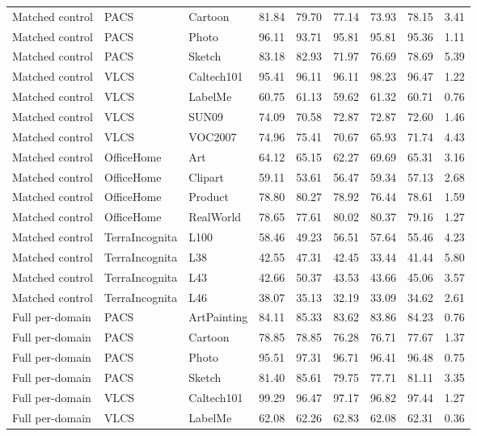 \begin{longtable}{lllrrrrrr}
Matched control & PACS & Cartoon & 81.84 & 79.70 & 77.14 & 73.93 & 78.15 & 3.41 \\
Matched control & PACS & Photo & 96.11 & 93.71 & 95.81 & 95.81 & 95.36 & 1.11 \\
Matched control & PACS & Sketch & 83.18 & 82.93 & 71.97 & 76.69 & 78.69 & 5.39 \\
Matched control & VLCS & Caltech101 & 95.41 & 96.11 & 96.11 & 98.23 & 96.47 & 1.22 \\
Matched control & VLCS & LabelMe & 60.75 & 61.13 & 59.62 & 61.32 & 60.71 & 0.76 \\
Matched control & VLCS & SUN09 & 74.09 & 70.58 & 72.87 & 72.87 & 72.60 & 1.46 \\
Matched control & VLCS & VOC2007 & 74.96 & 75.41 & 70.67 & 65.93 & 71.74 & 4.43 \\
Matched control & OfficeHome & Art & 64.12 & 65.15 & 62.27 & 69.69 & 65.31 & 3.16 \\
Matched control & OfficeHome & Clipart & 59.11 & 53.61 & 56.47 & 59.34 & 57.13 & 2.68 \\
Matched control & OfficeHome & Product & 78.80 & 80.27 & 78.92 & 76.44 & 78.61 & 1.59 \\
Matched control & OfficeHome & RealWorld & 78.65 & 77.61 & 80.02 & 80.37 & 79.16 & 1.27 \\
Matched control & TerraIncognita & L100 & 58.46 & 49.23 & 56.51 & 57.64 & 55.46 & 4.23 \\
Matched control & TerraIncognita & L38 & 42.55 & 47.31 & 42.45 & 33.44 & 41.44 & 5.80 \\
Matched control & TerraIncognita & L43 & 42.66 & 50.37 & 43.53 & 43.66 & 45.06 & 3.57 \\
Matched control & TerraIncognita & L46 & 38.07 & 35.13 & 32.19 & 33.09 & 34.62 & 2.61 \\
Full per-domain & PACS & ArtPainting & 84.11 & 85.33 & 83.62 & 83.86 & 84.23 & 0.76 \\
Full per-domain & PACS & Cartoon & 78.85 & 78.85 & 76.28 & 76.71 & 77.67 & 1.37 \\
Full per-domain & PACS & Photo & 95.51 & 97.31 & 96.71 & 96.41 & 96.48 & 0.75 \\
Full per-domain & PACS & Sketch & 81.40 & 85.61 & 79.75 & 77.71 & 81.11 & 3.35 \\
Full per-domain & VLCS & Caltech101 & 99.29 & 96.47 & 97.17 & 96.82 & 97.44 & 1.27 \\
Full per-domain & VLCS & LabelMe & 62.08 & 62.26 & 62.83 & 62.08 & 62.31 & 0.36 \\

\end{longtable}
